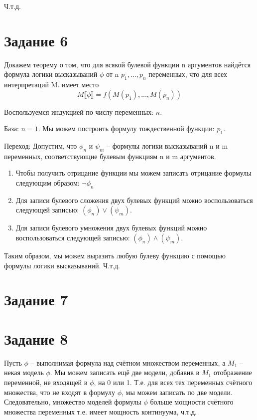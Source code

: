 \documentclass{article}
\begin{document}
Ч.т.д.

\section*{Задание 6}
Докажем теорему о том, что для всякой булевой функции n аргументов 
найдётся формула логики высказываний \(\phi\) от n \(p_1,...,p_n\) переменных, что для всех интерпретаций M.
имеет место
\[M \llbracket \phi \rrbracket = f(M(p_1), ..., M(p_n))\]

Воспользуемся индукцией по числу переменных: \(n\).

База: \(n = 1\).
Мы можем построить формулу тождественной функции: \(p_1\).

Переход: 
Допустим, что \(\phi_n\) и \(\psi_m\) -- формулы логики высказываний n и m переменных, 
соответствующие булевым функциям n и m аргументов.

\begin{enumerate}
    \item 
        Чтобы получить отрицание функции мы можем записать 
        отрицание формулы следующим образом: \(\neg \phi_n\)
    \item 
        Для записи булевого сложения двух булевых функций можно воспользоваться
        следующей записью: \((\phi_n) \lor (\psi_m)\).
    \item 
        Для записи булевого умножения двух булевых функций можно воспользоваться
        следующей записью: \((\phi_n) \land (\psi_m)\).
\end{enumerate}

Таким образом, мы можем выразить любую булеву функцию 
с помощью формулы логики высказываний. Ч.т.д.
\section*{Задание 7}

\section*{Задание 8}
Пусть \(\phi\) -- выполнимая формула над счётном множеством переменных, а 
\(M_1\) -- некая модель \(\phi\). Мы можем записать ещё две модели, 
добавив в \(M_1\) отображение переменной, не входящей в \(\phi\), на 0 или 1.
Т.е. для всех тех переменных счётного множества, что не входят в формулу \(\phi\), 
мы можем записать по две модели. Следовательно, множество 
моделей формулы \(\phi\) больше мощности счётного множества переменных 
т.е. имеет мощность континуума, ч.т.д.  
\end{document}
